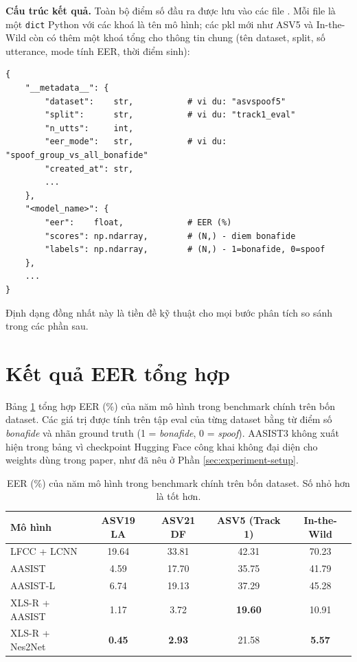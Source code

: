 \textbf{Cấu trúc kết quả.} Toàn bộ điểm số đầu ra được lưu vào các file . Mỗi file là một \texttt{dict} Python với các khoá là tên mô hình; các pkl mới như ASV5 và In-the-Wild còn có thêm một khoá tổng  cho thông tin chung (tên dataset, split, số utterance, mode tính EER, thời điểm sinh):

\begin{verbatim}
{
    "__metadata__": {
        "dataset":    str,           # vi du: "asvspoof5"
        "split":      str,           # vi du: "track1_eval"
        "n_utts":     int,
        "eer_mode":   str,           # vi du: "spoof_group_vs_all_bonafide"
        "created_at": str,
        ...
    },
    "<model_name>": {
        "eer":    float,             # EER (%)
        "scores": np.ndarray,        # (N,) - diem bonafide
        "labels": np.ndarray,        # (N,) - 1=bonafide, 0=spoof
    },
    ...
}
\end{verbatim}

Định dạng đồng nhất này là tiền đề kỹ thuật cho mọi bước phân tích so sánh trong các phần sau.

\section{Kết quả EER tổng hợp}

Bảng \ref{tab:eer-results} tổng hợp EER (\%) của năm mô hình trong benchmark chính trên bốn dataset. Các giá trị được tính trên tập eval của từng dataset bằng  từ điểm số \textit{bonafide} và nhãn ground truth (1 = \textit{bonafide}, 0 = \textit{spoof}). AASIST3 không xuất hiện trong bảng vì checkpoint Hugging Face công khai không đại diện cho weights dùng trong paper, như đã nêu ở Phần \ref{sec:experiment-setup}.

\begin{table}[H]
    \centering
    \begin{tabular}{l|c|c|c|c}
        \textbf{Mô hình} & \textbf{ASV19 LA} & \textbf{ASV21 DF} & \textbf{ASV5 (Track 1)} & \textbf{In-the-Wild}
        \\ \hline
        LFCC + LCNN & 19.64 & 33.81 & 42.31 & 70.23
        \\ \hline
        AASIST & 4.59 & 17.70 & 35.75 & 41.79
        \\ \hline
        AASIST-L & 6.74 & 19.13 & 37.29 & 45.28
        \\ \hline
        XLS-R + AASIST & 1.17 & 3.72 & \textbf{19.60} & 10.91
        \\ \hline
        XLS-R + Nes2Net & \textbf{0.45} & \textbf{2.93} & 21.58 & \textbf{5.57}
    \end{tabular}
    \caption{EER (\%) của năm mô hình trong benchmark chính trên bốn dataset. Số nhỏ hơn là tốt hơn.}
    \label{tab:eer-results}
\end{table}

